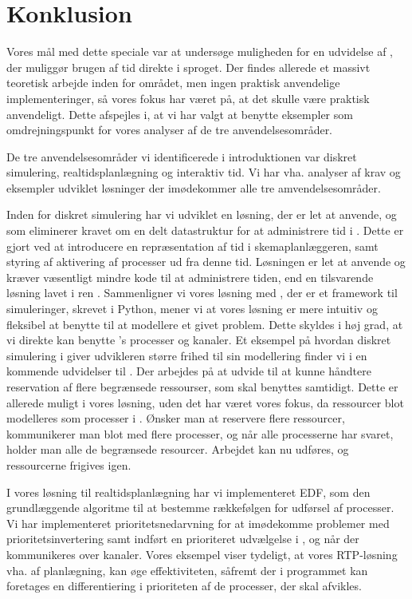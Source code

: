 \chapter{Konklusion} 
\label{chap:konklusion}
\thispagestyle{empty}

Vores mål med dette speciale var at undersøge muligheden for en udvidelse af \pycsp, der muliggør brugen af tid direkte i sproget. Der findes allerede et massivt teoretisk arbejde inden for området, men ingen praktisk anvendelige implementeringer, så vores fokus har været på, at det skulle være praktisk anvendeligt. Dette afspejles i, at vi har valgt at benytte eksempler som omdrejningspunkt for vores analyser af de tre anvendelsesområder. 

De tre anvendelsesområder vi identificerede i introduktionen var diskret simulering, realtidsplanlægning og interaktiv tid. Vi har vha. analyser af krav og eksempler udviklet løsninger der imødekommer alle tre amvendelsesområder. 

Inden for diskret simulering har vi udviklet en løsning, der er let at anvende, og som eliminerer kravet om en delt datastruktur for at administrere tid i \pycsp. Dette er gjort ved at introducere en repræsentation af tid i skemaplanlæggeren, samt styring af aktivering af processer ud fra denne tid. Løsningen er let at anvende og kræver væsentligt mindre kode til at administrere tiden, end en tilsvarende løsning lavet i ren \pycsp. 
Sammenligner vi vores løsning med \simpy, der er et framework til simuleringer, skrevet i Python, mener vi at vores løsning er mere intuitiv og fleksibel at benytte til at modellere et givet problem. Dette skyldes i høj grad, at vi direkte kan benytte \pycsp's processer og kanaler. Et eksempel på hvordan diskret simulering i \pycsp giver udvikleren større frihed til sin modellering finder vi i en kommende udvidelser til \simpy. Der arbejdes  på at udvide \simpy til at kunne håndtere reservation af flere begrænsede ressourser, som skal benyttes samtidigt. Dette er allerede muligt i vores løsning, uden det har været vores fokus, da ressourcer blot modelleres som processer i \pycsp. Ønsker man at reservere flere ressourcer, kommunikerer man blot med flere processer, og når alle processerne har svaret, holder man alle de begrænsede resourcer. Arbejdet kan nu udføres, og ressourcerne frigives igen. 

I vores løsning til realtidsplanlægning har vi implementeret EDF, som den grundlæggende algoritme til at bestemme rækkefølgen for udførsel af processer. Vi har implementeret prioritetsnedarvning for at imødekomme problemer med prioritetsinvertering samt indført en prioriteret udvælgelse i , og når der kommunikeres over kanaler. Vores eksempel viser tydeligt, at vores RTP-løsning vha. af planlægning, kan øge effektiviteten, såfremt der i programmet kan foretages en differentiering i prioriteten af de processer, der skal afvikles. 

